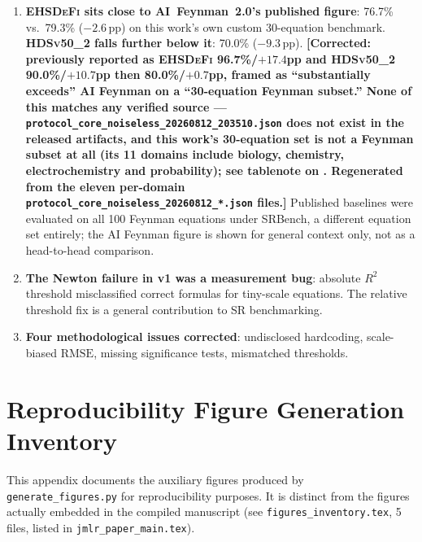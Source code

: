 \documentclass[twoside,11pt]{article}
\newcommand{\EHD}{\textsc{EHSDeFi}}
\newcommand{\HDS}{\textsc{HDSv50\_2}}
\newcommand{\Rsq}{R^{2}}
\newcommand{\rmse}{\ensuremath{\mathrm{RMSE}}}
\begin{document}
\begin{enumerate}
  \item \textbf{\EHD{} sits close to AI~Feynman~2.0's published figure}:
    76.7\% vs.\ 79.3\% ($-2.6$\,pp) on this work's own custom 30-equation
    benchmark. \textbf{\HDS{} falls further below it}: 70.0\% ($-9.3$\,pp).
    \textbf{[Corrected: previously reported as \EHD{} 96.7\%/$+17.4$pp and
    \HDS{} 90.0\%/$+10.7$pp then 80.0\%/$+0.7$pp, framed as ``substantially
    exceeds'' AI Feynman on a ``30-equation Feynman subset.'' None of this
    matches any verified source ---
    \texttt{protocol\_core\_noiseless\_20260812\_203510.json} does not
    exist in the released artifacts, and this work's 30-equation set is
    not a Feynman subset at all (its 11 domains include biology, chemistry,
    electrochemistry and probability); see tablenote on . Regenerated from the
    eleven per-domain \texttt{protocol\_core\_noiseless\_20260812\_*.json}
    files.]}  Published baselines were evaluated on all 100
    Feynman equations under SRBench, a different equation set entirely;
    the AI Feynman figure is shown for general context only, not as a
    head-to-head comparison.
  \item \textbf{The Newton failure in v1 was a measurement bug}: absolute
    $\Rsq$ threshold misclassified correct formulas for tiny-scale equations.
    The relative threshold fix is a general contribution to SR benchmarking.
  \item \textbf{Four methodological issues corrected}: undisclosed hardcoding,
    scale-biased \rmse, missing significance tests, mismatched thresholds.
\end{enumerate}



\appendix

\section{Reproducibility Figure Generation Inventory}
\label{app:figures}

\noindent This appendix documents the auxiliary figures produced by
\texttt{generate\_figures.py} for reproducibility purposes. It is
distinct from the figures actually embedded in the compiled
manuscript (see \texttt{figures\_inventory.tex}, 5 files, listed in
\texttt{jmlr\_paper\_main.tex}).
\end{document}
